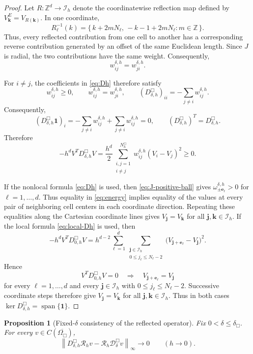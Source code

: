 \documentclass[11pt]{article}
\newtheorem{proposition}[theorem]{Proposition}
\theoremstyle{definition}
\newcommand{\cD}{\mathcal{D}}
\newcommand{\cR}{\mathcal{R}}
\newcommand{\norm}[1]{\left\lVert #1\right\rVert}
\newcommand{\one}{\mathbf{1}}
\newcommand{\jj}{\bm j}
\newcommand{\kk}{\bm k}
\newcommand{\ee}{\bm e}
\begin{document}
\begin{proof}
Let $R:\mathbb Z^d\to\mathcal I_h$ denote the coordinatewise reflection map
defined by $V^E_{\kk}=V_{R(\kk)}$.  In one coordinate,
\[
 R_\ell^{-1}(k)
 =
 \{\,k+2mN_\ell,\,-k-1+2mN_\ell:m\in\mathbb Z\,\}.
\]
Thus, every reflected contribution from one cell to another has a
corresponding reverse contribution generated by an offset of the same Euclidean
length.  Since $J$ is radial, the two contributions have the same weight.
Consequently,
\[
w_{ij}^{\delta,h}=w_{ji}^{\delta,h}.
\]

For $i\ne j$, the coefficients in \eqref{eq:Dh} therefore satisfy
\[
 w_{ij}^{\delta,h}\ge0,\qquad w_{ij}^{\delta,h}=w_{ji}^{\delta,h},\qquad
 (D_{\delta,h}^{\Box})_{ii}=-\sum_{j\ne i}w_{ij}^{\delta,h}.
\]
Consequently,
\[
 (D_{\delta,h}^{\Box}\one)_i=-\sum_{j\ne i}w_{ij}^{\delta,h}+\sum_{j\ne i}w_{ij}^{\delta,h}=0,
 \qquad
 (D_{\delta,h}^{\Box})^T=D_{\delta,h}^{\Box}.
\]
Therefore
\[
 -h^dV^TD_{\delta,h}^{\Box}V
 =
 \frac{h^d}{2}
 \sum_{\substack{i,j=1\\ i\ne j}}^{N_h^{\Box}}
 w_{ij}^{\delta,h}(V_i-V_j)^2
 \ge0.
\]

If the nonlocal formula \eqref{eq:Dh} is used, then \eqref{eq:J-positive-ball} gives $\omega_{\pm\ee_\ell}^{\delta,h}>0$ for $\ell=1,\ldots,d$.  Thus equality in \eqref{eq:energy} implies equality of the values at every
pair of neighboring cell centers in each coordinate direction.  Repeating
these equalities along the Cartesian coordinate lines gives $V_{\jj}=V_{\kk}$ for all $\jj,\kk\in\mathcal I_h$.  If the local formula \eqref{eq:local-Dh} is used, then
\[
 -h^dV^TD_{0,h}^{\Box}V
 =
 h^{d-2}
 \sum_{\ell=1}^d
 \sum_{\substack{\jj\in\mathcal I_h\\0\le j_\ell\le N_\ell-2}}
 \big(V_{\jj+\ee_\ell}-V_{\jj}\big)^2.
\]
Hence
\[
 V^TD_{0,h}^{\Box}V=0
 \quad\Longrightarrow\quad
 V_{\jj+\ee_\ell}=V_{\jj}
\]
for every $\ell=1,\ldots,d$ and every
$\jj\in\mathcal I_h$ with $0\le j_\ell\le N_\ell-2$.  Successive coordinate steps therefore give $V_{\jj}=V_{\kk}$ for all $\jj,\kk\in\mathcal I_h$.  Thus in both cases $\ker D_{\delta,h}^{\Box}=\operatorname{span}\{\one\}$.
\end{proof}

\begin{proposition}[Fixed-$\delta$ consistency of the reflected operator]
\label{prop:fixed-delta-consistency}
Fix $0<\delta\le\delta_{\Box}$.  For every $v\in C(\overline{\Omega_{\Box}})$,
\begin{equation}
\label{eq:fixed-scale}
 \norm{D_{\delta,h}^{\Box}\cR_hv
       -\cR_h\cD_\delta^{\Box}v}_\infty
 \longrightarrow0
 \qquad(h\to0).
\end{equation}
\end{proposition}
\end{document}
